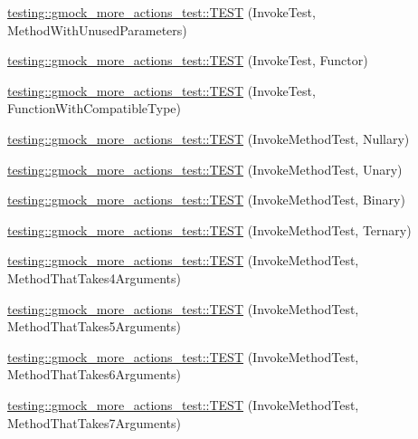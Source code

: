 \begin{DoxyCompactItemize}
\item 
\hyperlink{namespacetesting_1_1gmock__more__actions__test_a4f48af38351403b569fc6dfae7787ed2}{testing\+::gmock\+\_\+more\+\_\+actions\+\_\+test\+::\+T\+E\+ST} (Invoke\+Test, Method\+With\+Unused\+Parameters)
\item 
\hyperlink{namespacetesting_1_1gmock__more__actions__test_ac56a4cb164b338d3f388ed3f4306a5a5}{testing\+::gmock\+\_\+more\+\_\+actions\+\_\+test\+::\+T\+E\+ST} (Invoke\+Test, Functor)
\item 
\hyperlink{namespacetesting_1_1gmock__more__actions__test_af9dfd7f1d4186ee4de2d9871a19dba5a}{testing\+::gmock\+\_\+more\+\_\+actions\+\_\+test\+::\+T\+E\+ST} (Invoke\+Test, Function\+With\+Compatible\+Type)
\item 
\hyperlink{namespacetesting_1_1gmock__more__actions__test_abb046fd809977722720c9ce63afd7af5}{testing\+::gmock\+\_\+more\+\_\+actions\+\_\+test\+::\+T\+E\+ST} (Invoke\+Method\+Test, Nullary)
\item 
\hyperlink{namespacetesting_1_1gmock__more__actions__test_a386ce48f1f0a49e2b94a16deeffc2084}{testing\+::gmock\+\_\+more\+\_\+actions\+\_\+test\+::\+T\+E\+ST} (Invoke\+Method\+Test, Unary)
\item 
\hyperlink{namespacetesting_1_1gmock__more__actions__test_a86221fa7d09853358e38c01b0d6ceced}{testing\+::gmock\+\_\+more\+\_\+actions\+\_\+test\+::\+T\+E\+ST} (Invoke\+Method\+Test, Binary)
\item 
\hyperlink{namespacetesting_1_1gmock__more__actions__test_a2b98a8a68d37a0bec600227372a1cff8}{testing\+::gmock\+\_\+more\+\_\+actions\+\_\+test\+::\+T\+E\+ST} (Invoke\+Method\+Test, Ternary)
\item 
\hyperlink{namespacetesting_1_1gmock__more__actions__test_af0ab6ef9fdf48e8442a5579ab27eb517}{testing\+::gmock\+\_\+more\+\_\+actions\+\_\+test\+::\+T\+E\+ST} (Invoke\+Method\+Test, Method\+That\+Takes4\+Arguments)
\item 
\hyperlink{namespacetesting_1_1gmock__more__actions__test_a512db122c5beadeeef026bb54aec7e45}{testing\+::gmock\+\_\+more\+\_\+actions\+\_\+test\+::\+T\+E\+ST} (Invoke\+Method\+Test, Method\+That\+Takes5\+Arguments)
\item 
\hyperlink{namespacetesting_1_1gmock__more__actions__test_a715c088109e141aa577e497e3729b98b}{testing\+::gmock\+\_\+more\+\_\+actions\+\_\+test\+::\+T\+E\+ST} (Invoke\+Method\+Test, Method\+That\+Takes6\+Arguments)
\item 
\hyperlink{namespacetesting_1_1gmock__more__actions__test_a1f11171c55d049143c980502213e0b11}{testing\+::gmock\+\_\+more\+\_\+actions\+\_\+test\+::\+T\+E\+ST} (Invoke\+Method\+Test, Method\+That\+Takes7\+Arguments)

\end{DoxyCompactItemize}
